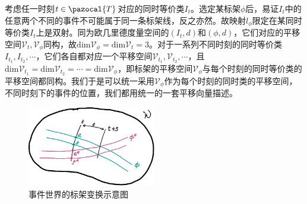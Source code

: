 \documentclass[main.tex]{subfiles}
\begin{document}
考虑任一时刻$t\in\pazocal{T}$对应的同时等价类$I_t$。选定某标架$\phi$后，易证$I_t$中的任意两个不同的事件不可能属于同一条标架线，反之亦然。故映射$l_\phi$限定在某同时等价类$I_t$上是双射。同为欧几里德度量空间的$\left(I_t,d\right)$和$\left(\phi,d\right)$，它们对应的平移空间$\mathcal{V}_t,\mathcal{V}_\phi$同构，故$\mathrm{dim}\mathcal{V}_\phi=\mathrm{dim}\mathcal{V}_t=3$。对于一系列不同时刻的同时等价类$I_{t_1},I_{t_2},\cdots$，它们各自都对应一个平移空间$\mathcal{V}_{t_1},\mathcal{V}_{t_2},\cdots$，且$\mathrm{dim}\mathcal{V}_{t_1}=\mathrm{dim}\mathcal{V}_{t_2}=\cdots=\mathrm{dim}\mathcal{V}_\phi$，即标架的平移空间$\mathcal{V}_\phi$与每个时刻的同时等价类的平移空间都同构。我们于是可以统一采用$\mathcal{V}_\phi$作为每个时刻的同时类的平移空间，不同时刻下的事件的位置，我们都用统一的一套平移向量描述。

\begin{figure}[h]
    \centering
    \includegraphics[width=0.5\textwidth]{images/III.1.4.eps}
    \caption{事件世界的标架变换示意图}
    \label{fig:III.1.4}
\end{figure}
\end{document}
